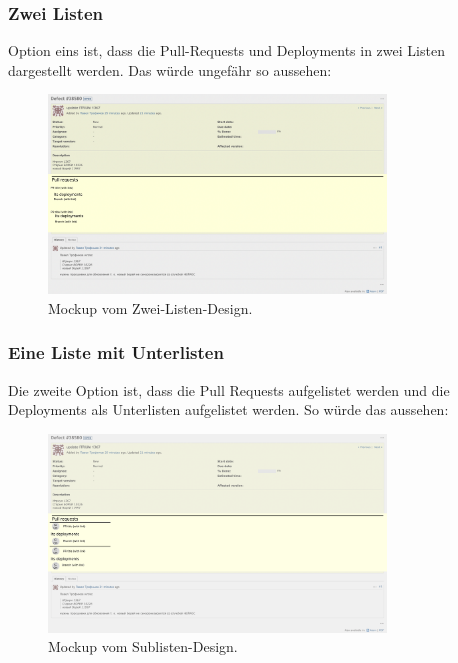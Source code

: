 \subsubsection{Zwei Listen}
Option eins ist, dass die Pull-Requests und Deployments in zwei Listen dargestellt werden. Das würde ungefähr so
aussehen:
\begin{figure}[H]
  \centering
  \includegraphics[width=0.8\textwidth]{images/mockup/multiple-lists.png}
  \caption[Ein Mockup, bei welchem die Deployments und Pull Requests separate Listen haben.]{Mockup vom Zwei-Listen-Design.}
  \label{fig:mockup_multi_lists}
\end{figure}

\subsubsection{Eine Liste mit Unterlisten}
Die zweite Option ist, dass die Pull Requests aufgelistet werden und die Deployments als Unterlisten aufgelistet
werden. So würde das aussehen:
\begin{figure}
  \centering 
  \includegraphics[width=0.8\textwidth]{images/mockup/sublists.png}
  \caption[Ein Mockup, bei welchem die Deployments als Unterlisten aufgelistet werden.]{Mockup vom Sublisten-Design.}
  \label{fig:mockup_sublists}
\end{figure}

